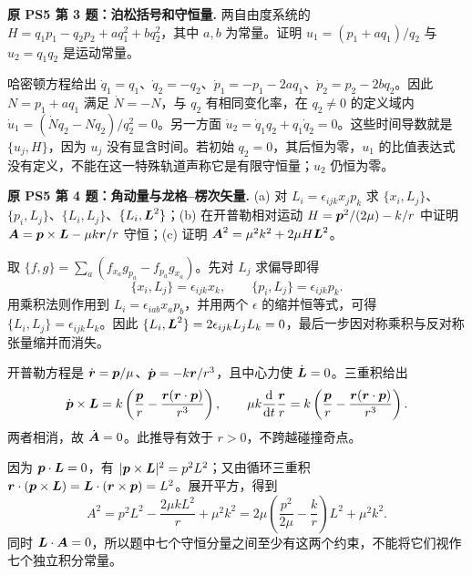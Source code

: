 \begin{example}
\textbf{原 PS5 第 3 题：泊松括号和守恒量.} 
两自由度系统的 $H=q_1p_1-q_2p_2+aq_1^2+bq_2^2$，其中 $a,b$ 为常量。证明 $u_1=(p_1+aq_1)/q_2$ 与 $u_2=q_1q_2$ 是运动常量。
\end{example}
\begin{solution}
哈密顿方程给出 $\dot q_1=q_1$、$\dot q_2=-q_2$、$\dot p_1=-p_1-2aq_1$、$\dot p_2=p_2-2bq_2$。因此 $N=p_1+aq_1$ 满足 $\dot N=-N$，与 $q_2$ 有相同变化率，在 $q_2\ne0$ 的定义域内 $\dot u_1=(\dot Nq_2-N\dot q_2)/q_2^2=0$。另一方面 $\dot u_2=\dot q_1q_2+q_1\dot q_2=0$。这些时间导数就是 $\{u_j,H\}$，因为 $u_j$ 没有显含时间。若初始 $q_2=0$，其后恒为零，$u_1$ 的比值表达式没有定义，不能在这一特殊轨道声称它是有限守恒量；$u_2$ 仍恒为零。
\end{solution}

\begin{example}
\textbf{原 PS5 第 4 题：角动量与龙格--楞次矢量.} 
(a) 对 $L_i=\epsilon_{ijk}x_jp_k$ 求 $\{x_i,L_j\}$、$\{p_i,L_j\}$、$\{L_i,L_j\}$、$\{L_i,\boldsymbol{L}^2\}$；(b) 在开普勒相对运动 $H=\boldsymbol{p}^2/(2\mu)-k/r$ 中证明 $\boldsymbol{A}=\boldsymbol{p}\times\boldsymbol{L}-\mu k\boldsymbol{r}/r$ 守恒；(c) 证明 $\boldsymbol{A}^2=\mu^2k^2+2\mu H\boldsymbol{L}^2$。
\end{example}
\begin{solution}
取 $\{f,g\}=\sum_a(f_{x_a}g_{p_a}-f_{p_a}g_{x_a})$。先对 $L_j$ 求偏导即得
\[
 \{x_i,L_j\}=\epsilon_{ijk}x_k,\qquad
 \{p_i,L_j\}=\epsilon_{ijk}p_k.
\]
用乘积法则作用到 $L_i=\epsilon_{iab}x_ap_b$，并用两个 $\epsilon$ 的缩并恒等式，可得 $\{L_i,L_j\}=\epsilon_{ijk}L_k$。因此 $\{L_i,\boldsymbol{L}^2\}=2\epsilon_{ijk}L_jL_k=0$，最后一步因对称乘积与反对称张量缩并而消失。

开普勒方程是 $\dot{\boldsymbol{r}}=\boldsymbol{p}/\mu$、$\dot{\boldsymbol{p}}=-k\boldsymbol{r}/r^3$，且中心力使 $\dot{\boldsymbol{L}}=0$。三重积给出
\[
 \dot{\boldsymbol{p}}\times\boldsymbol{L}
 =k\left(\frac{\boldsymbol{p}}{r}-\frac{\boldsymbol{r}(\boldsymbol{r}\cdot\boldsymbol{p})}{r^3}\right),\qquad
 \mu k\frac{\mathrm d}{\mathrm dt}\frac{\boldsymbol{r}}{r}
 =k\left(\frac{\boldsymbol{p}}{r}-\frac{\boldsymbol{r}(\boldsymbol{r}\cdot\boldsymbol{p})}{r^3}\right).
\]
两者相消，故 $\dot{\boldsymbol{A}}=0$。此推导有效于 $r>0$，不跨越碰撞奇点。

因为 $\boldsymbol{p}\cdot\boldsymbol{L}=0$，有 $|\boldsymbol{p}\times\boldsymbol{L}|^2=p^2L^2$；又由循环三重积 $\boldsymbol{r}\cdot(\boldsymbol{p}\times\boldsymbol{L})=\boldsymbol{L}\cdot(\boldsymbol{r}\times\boldsymbol{p})=L^2$。展开平方，得到
\[
 A^2=p^2L^2-\frac{2\mu kL^2}{r}+\mu^2k^2
 =2\mu\left(\frac{p^2}{2\mu}-\frac kr\right)L^2+\mu^2k^2.
\]
同时 $\boldsymbol{L}\cdot\boldsymbol{A}=0$，所以题中七个守恒分量之间至少有这两个约束，不能将它们视作七个独立积分常量。
\end{solution}

